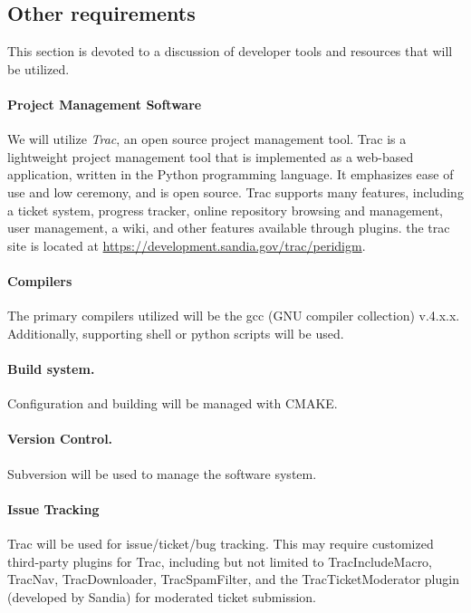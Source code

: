 \documentclass[10pt]{article}
\theoremstyle{plain}
\theoremstyle{definition}
\begin{document}
\subsection{Other requirements} \label{sec:OtherRequirements}

This section is devoted to a discussion of developer tools and resources that will be utilized.

\paragraph{Project Management Software}

We will utilize \emph{Trac}, an open source project management tool. Trac is a lightweight project management tool that is implemented as a web-based application, written in the Python programming language. It emphasizes ease of use and low ceremony, and is open source. Trac supports many features, including a ticket system, progress tracker, online repository browsing and management, user management, a wiki, and other features available through plugins. the trac site is located at \url{https://development.sandia.gov/trac/peridigm}.

\paragraph{Compilers}
The primary compilers utilized will be the gcc (GNU compiler collection) v.4.x.x.  Additionally, supporting shell or python scripts will be used.

\paragraph{Build system.}
Configuration and building will be managed with CMAKE.

\paragraph{Version Control.}
Subversion will be used to manage the software system.

\paragraph{Issue Tracking}
Trac will be used for issue/ticket/bug tracking. This may require customized third-party plugins for Trac, including but not limited to TracIncludeMacro, TracNav, TracDownloader, TracSpamFilter, and the TracTicketModerator plugin (developed by Sandia) for moderated ticket submission.
\end{document}

